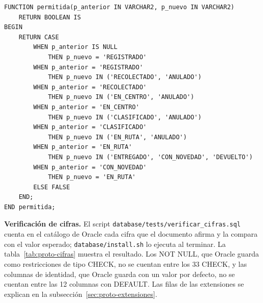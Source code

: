 \begin{lstlisting}[style=sqlpro]
FUNCTION permitida(p_anterior IN VARCHAR2, p_nuevo IN VARCHAR2)
    RETURN BOOLEAN IS
BEGIN
    RETURN CASE
        WHEN p_anterior IS NULL
            THEN p_nuevo = 'REGISTRADO'
        WHEN p_anterior = 'REGISTRADO'
            THEN p_nuevo IN ('RECOLECTADO', 'ANULADO')
        WHEN p_anterior = 'RECOLECTADO'
            THEN p_nuevo IN ('EN_CENTRO', 'ANULADO')
        WHEN p_anterior = 'EN_CENTRO'
            THEN p_nuevo IN ('CLASIFICADO', 'ANULADO')
        WHEN p_anterior = 'CLASIFICADO'
            THEN p_nuevo IN ('EN_RUTA', 'ANULADO')
        WHEN p_anterior = 'EN_RUTA'
            THEN p_nuevo IN ('ENTREGADO', 'CON_NOVEDAD', 'DEVUELTO')
        WHEN p_anterior = 'CON_NOVEDAD'
            THEN p_nuevo = 'EN_RUTA'
        ELSE FALSE
    END;
END permitida;
\end{lstlisting}

\textbf{Verificación de cifras.} El script
\texttt{database/tests/verificar\_cifras.sql} cuenta en el catálogo de
Oracle cada cifra que el documento afirma y la compara con el valor
esperado; \texttt{database/install.sh} lo ejecuta al terminar. La
tabla~\ref{tab:proto-cifras} muestra el resultado. Los NOT NULL, que
Oracle guarda como restricciones de tipo CHECK, no se cuentan entre los
33 CHECK, y las columnas de identidad, que Oracle guarda con un valor por
defecto, no se cuentan entre las 12 columnas con DEFAULT. Las filas de las
extensiones se explican en la subsección~\ref{sec:proto-extensiones}.

